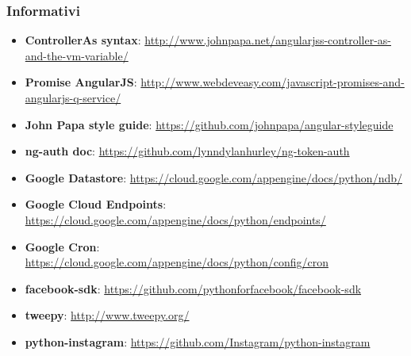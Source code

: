 		\subsubsection{Informativi} %
		\label{ssub:informativi}
			\begin{itemize}
				\item \textbf{ControllerAs syntax}: \newline	\url{http://www.johnpapa.net/angularjss-controller-as-and-the-vm-variable/}
				\item \textbf{Promise AngularJS}: \newline
\url{http://www.webdeveasy.com/javascript-promises-and-angularjs-q-service/}
				\item \textbf{John Papa style guide}: \url{https://github.com/johnpapa/angular-styleguide}
				\item \textbf{ng-auth doc}: \url{https://github.com/lynndylanhurley/ng-token-auth}
				\item \textbf{Google Datastore}: \url{https://cloud.google.com/appengine/docs/python/ndb/}
				\item \textbf{Google Cloud Endpoints}: \url{https://cloud.google.com/appengine/docs/python/endpoints/}
				\item \textbf{Google Cron}: \url{https://cloud.google.com/appengine/docs/python/config/cron}
				\item \textbf{facebook-sdk}: \url{https://github.com/pythonforfacebook/facebook-sdk}
				\item \textbf{tweepy}: \url{http://www.tweepy.org/}
				\item \textbf{python-instagram}: \url{https://github.com/Instagram/python-instagram}
			\end{itemize}
